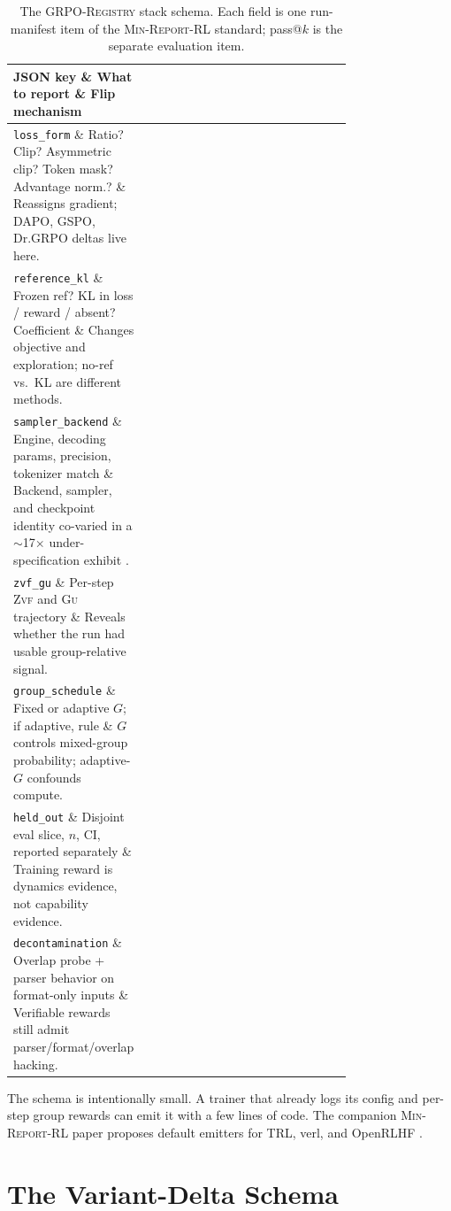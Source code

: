 \documentclass[11pt]{article}
\newcommand{\zvf}{\textsc{Zvf}}
\newcommand{\gu}{\textsc{Gu}}
\newcommand{\minreport}{\textsc{Min-Report-RL}}
\newcommand{\grpo}{\textsc{GRPO}}
\newcommand{\grpoReg}{\textsc{GRPO-Registry}}
\begin{document}
\begin{table}[t]
\centering
\caption{The \grpoReg{} stack schema. Each field is one run-manifest item of
  the \minreport{} standard; pass@$k$ is the separate evaluation item.}
\label{tab:stack-schema}
\small
\begin{tabular}{@{}lp{0.40\linewidth}p{0.36\linewidth}@{}}
\toprule
\textbf{JSON key} \& \textbf{What to report} \& \textbf{Flip mechanism}\\
\midrule
\texttt{loss\_form} \& Ratio? Clip? Asymmetric clip? Token mask? Advantage norm.?
  \& Reassigns gradient; DAPO, GSPO, Dr.\grpo{} deltas live here.\\
\texttt{reference\_kl} \& Frozen ref? KL in loss / reward / absent? Coefficient \&   Changes objective and exploration; no-ref vs.\ KL are different methods.\\
\texttt{sampler\_backend} \& Engine, decoding params, precision, tokenizer match \&   Backend, sampler, and checkpoint identity co-varied in a $\sim$17$\times$
  under-specification exhibit \cite{zvfaudit2026}.\\
\texttt{zvf\_gu} \& Per-step \zvf{} and \gu{} trajectory \&   Reveals whether the run had usable group-relative signal.\\
\texttt{group\_schedule} \& Fixed or adaptive $G$; if adaptive, rule \&   $G$ controls mixed-group probability; adaptive-$G$ confounds compute.\\
\texttt{held\_out} \& Disjoint eval slice, $n$, CI, reported separately \&   Training reward is dynamics evidence, not capability evidence.\\
\texttt{decontamination} \& Overlap probe + parser behavior on format-only inputs \&   Verifiable rewards still admit parser/format/overlap hacking.\\
\bottomrule
\end{tabular}
\end{table}

The schema is intentionally small. A trainer that already logs its config and
per-step group rewards can emit it with a few lines of code. The companion
\minreport{} paper proposes default emitters for TRL, verl, and OpenRLHF
\cite{minreportrl2026}.

\section{The Variant-Delta Schema}
\label{sec:delta-schema}
\end{document}

